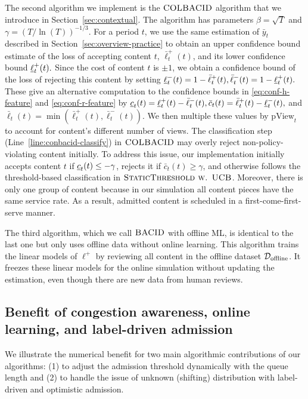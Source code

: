 The second algorithm we implement is the $\textsc{COLBACID}$ algorithm that we introduce in Section~\ref{sec:contextual}. The algorithm has parameters $\beta = \sqrt{T}$ and $\gamma = (T/\ln(T))^{-1/3}$. For a period $t$, we use the same estimation of $\bar{y}_{t}$ described in Section~\ref{sec:overview-practice} to obtain an upper confidence bound estimate of the loss of accepting content $t$,  $\bar{\ell}^+_t(t)$, and its lower confidence bound $\underline{\ell}^+_t(t).$ Since the cost of content $t$ is $\pm 1$, we obtain a confidence bound of the loss of rejecting this content by setting $\underline{\ell}^-_t(t) = 1 - \bar{\ell}^+_t(t), \bar{\ell}^-_t(t) = 1 - \underline{\ell}^+_t(t).$ These give an alternative computation to the confidence bounds in \eqref{eq:conf-h-feature} and \eqref{eq:conf-r-feature} by $\underline{c}_t(t) = \underline{\ell}^+_t(t) - \bar{\ell}^-_t(t), \bar{c}_t(t) = \bar{\ell}^+_t(t) - \underline{\ell}^-_t(t), $ and $\bar{\ell}_t(t) = \min(\bar{\ell}^+_t(t), \bar{\ell}^-_t(t)).$ We then multiple these values by $\text{pView}_t$ to account for content's different number of views. The classification step (Line~\ref{line:conbacid-classify}) in $\textsc{COLBACID}$ may overly reject non-policy-violating content initially. To address this issue, our implementation initially accepts content $t$ if $\underline{c}_t(t) \leq -\gamma$, rejects it if $\bar{c}_t(t) \geq \gamma$, and otherwise follows the threshold-based classification in $\textsc{StaticThreshold w. UCB}$. Moreover, there is only one group of content because in our simulation all content pieces have the same service rate. As a result, admitted content is scheduled in a first-come-first-serve manner.

The third algorithm, which we call $\textsc{BACID}$ with offline ML, is identical to the last one but only uses offline data without online learning. This algorithm  trains the linear models of $\ell^+$ by reviewing all content in the offline dataset $\mathcal{D}_{\text{offline}}$. It freezes these linear models for the online simulation without updating the estimation, even though there are new data from human reviews.

\subsection{Benefit of congestion awareness, online learning, and label-driven admission}\label{sec:evaluation}
We illustrate the numerical benefit for two main algorithmic contributions of our algorithms: (1) to adjust the admission threshold dynamically with the queue length and (2) to handle the issue of unknown (shifting) distribution with label-driven and optimistic admission.

